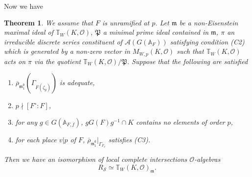 \documentclass[12pt,oneside,reqno]{amsart}
\newcommand{\A}{\mathbb{A}}
\theoremstyle{plain}
\newtheorem{theorem}{Theorem}[section]
\begin{document}
	Now we have
	\begin{theorem}\label{R=T}
		We assume that $F$ is unramified at $p$.
		Let $\mathfrak{m}$ be a non-Eisenstein maximal ideal of $\mathbb{T}_{W}(K,\mathcal{O})$, $\mathfrak{P}$ a minimal prime ideal contained in $\mathfrak{m}$, $\pi$ an irreducible discrete series constituent of $\mathcal{A}(G(\mathbb{A}_F))$ satisfying condition (C2) which is generated by a non-zero vector in $M_{W,p}(K,\mathcal{O})$ such that $\mathbb{T}_W(K,\mathcal{O})$ acts on $\pi$ via the quotient $\mathbb{T}_W(K,\mathcal{O})/\mathfrak{P}$.
		Suppose that the following are satisfied
		\begin{enumerate}
			\item 
			$\overline{\rho}_{\mathfrak{m}_1^\emptyset}
			(\Gamma_{F(\zeta_p)})$
			is adequate,
			
			
			\item 
			$p\nmid[F^\circ:F]$,
			
			
			\item 
			for any $g\in G(\A_{F,f})$, $gG(F)g^{-1}\cap K$ contains no elements of order $p$,
			
			
			
			
			\item 
			for each place $v|p$ of $F$, $\overline{\rho}_{\mathfrak{m}_1^\emptyset}|_{\Gamma_{F_v}}$ satisfies (C3).
		\end{enumerate}
	    Then we have an isomorphism of \emph{local complete intersections}
		$\mathcal{O}$-algebras
		\[
		R_\mathcal{S}
		\simeq
		\mathbb{T}_W(K,\mathcal{O})_{\mathfrak{m}}.
		\]
	\end{theorem}
\end{document}
